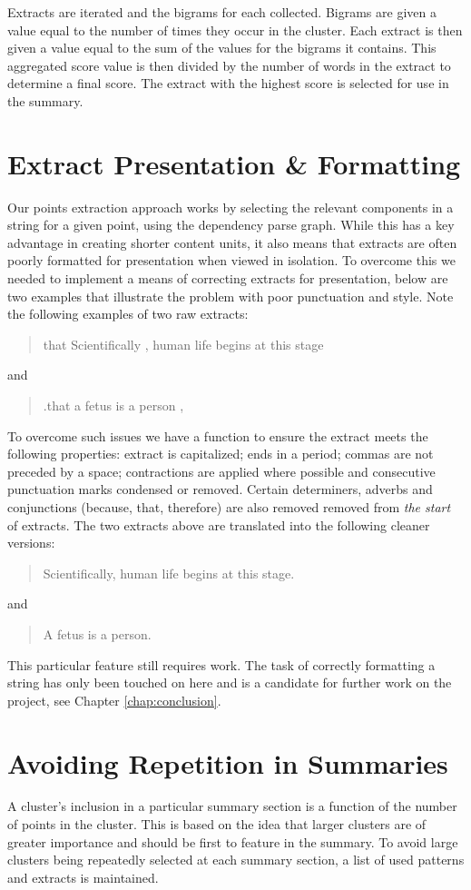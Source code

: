     Extracts are iterated and the bigrams for each collected. Bigrams are given a value equal to the number of times they occur in the cluster. Each extract is then given a value equal to the sum of the values for the bigrams it contains. This aggregated score value is then divided by the number of words in the extract to determine a final score. The extract with the highest score is selected for use in the summary.

  \section{Extract Presentation \& Formatting}
    Our points extraction approach works by selecting the relevant components in a string for a given point, using the dependency parse graph. While this has a key advantage in creating shorter content units, it also means that extracts are often poorly formatted for presentation when viewed in isolation. To overcome this we needed to implement a means of correcting extracts for presentation, below are two examples that illustrate the problem with poor punctuation and style. Note the following examples of two raw extracts: \blockquote{that Scientifically , human life begins at this stage} and \blockquote{.that a fetus is a person ,}.

    To overcome such issues we have a function to ensure the extract meets the following properties: extract is capitalized; ends in a period; commas are not preceded by a space; contractions are applied where possible and consecutive punctuation marks condensed or removed. Certain determiners, adverbs and conjunctions (because, that, therefore) are also removed removed from \textit{the start} of extracts. The two extracts above are translated into the following cleaner versions: \blockquote{Scientifically, human life begins at this stage.} and \blockquote{A fetus is a person.}.

    This particular feature still requires work. The task of correctly formatting a string has only been touched on here and is a candidate for further work on the project, see Chapter \ref{chap:conclusion}.

  \section{Avoiding Repetition in Summaries}
    A cluster's inclusion in a particular summary section is a function of the number of points in the cluster. This is based on the idea that larger clusters are of greater importance and should be first to feature in the summary. To avoid large clusters being repeatedly selected at each summary section, a list of used patterns and extracts is maintained.

